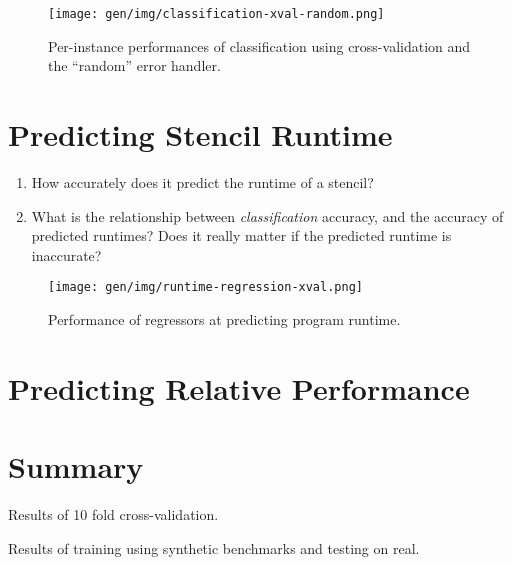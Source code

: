 \begin{figure}
\centering
\texttt{[image: gen/img/classification-xval-random.png]}
\caption{%
  Per-instance performances of classification using cross-validation
  and the ``random'' error handler.%
}
\end{figure}





\section{Predicting Stencil Runtime}

\begin{enumerate}
\item How accurately does it predict the runtime of a stencil?
\item What is the relationship between \emph{classification} accuracy,
  and the accuracy of predicted runtimes? Does it really matter if the
  predicted runtime is inaccurate?
\end{enumerate}

\begin{figure}
\centering
\texttt{[image: gen/img/runtime-regression-xval.png]}
\caption{%
  Performance of regressors at predicting program runtime.%
}
\end{figure}


\section{Predicting Relative Performance}


\section{Summary}

\begin{table}
\scriptsize

\caption{Results of 10 fold cross-validation.}
\end{table}

\begin{table}
\scriptsize

\caption{Results of training using synthetic benchmarks and testing on
  real.}
\end{table}
